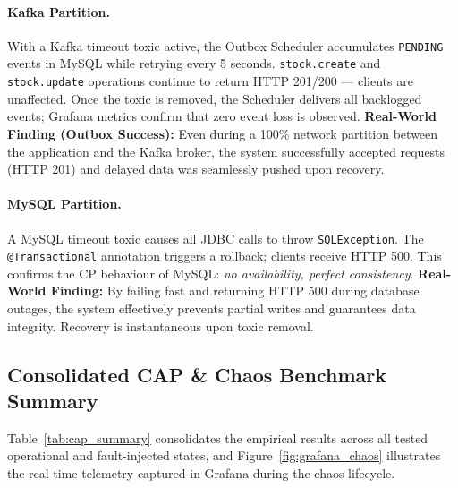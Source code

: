 \documentclass[12pt,a4paper,twoside]{article}
\begin{document}
\paragraph{Kafka Partition.}
With a Kafka timeout toxic active, the Outbox Scheduler accumulates
\texttt{PENDING} events in MySQL while retrying every 5 seconds.
\texttt{stock.create} and \texttt{stock.update} operations continue to
return HTTP 201/200 — clients are unaffected.
Once the toxic is removed, the Scheduler delivers all backlogged events;
Grafana metrics confirm that zero event loss is observed.
\textbf{Real-World Finding (Outbox Success):} Even during a 100\% network partition
between the application and the Kafka broker, the system successfully accepted
requests (HTTP 201) and delayed data was seamlessly pushed upon recovery.

\paragraph{MySQL Partition.}
A MySQL timeout toxic causes all JDBC calls to throw
\texttt{SQLException}.
The \texttt{@Transactional} annotation triggers a rollback; clients
receive HTTP 500.
This confirms the CP behaviour of MySQL: \emph{no availability, perfect
consistency}.
\textbf{Real-World Finding:} By failing fast and returning HTTP 500 during database
outages, the system effectively prevents partial writes and guarantees data
integrity. Recovery is instantaneous upon toxic removal.

\subsection{Consolidated CAP \& Chaos Benchmark Summary}

Table~\ref{tab:cap_summary} consolidates the empirical results across all tested operational and fault-injected states, and Figure~\ref{fig:grafana_chaos} illustrates the real-time telemetry captured in Grafana during the chaos lifecycle.
\end{document}

